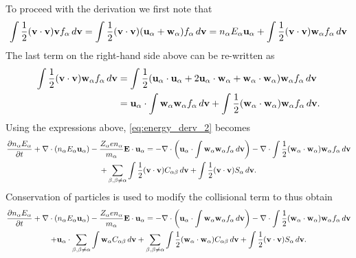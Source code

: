 \documentclass[a4paper,11pt]{report}
\begin{document}
To proceed with the derivation we first note that
\begin{multline}
\int \frac{1}{2} (\mathbf{v} \cdot \mathbf{v}) \mathbf{v} f_\alpha \, d\mathbf{v} = \int \frac{1}{2} (\mathbf{v} \cdot \mathbf{v}) (\mathbf{u}_\alpha + \mathbf{w}_\alpha) f_\alpha \, d\mathbf{v} = n_\alpha E_\alpha \mathbf{u}_\alpha + \int \frac{1}{2} (\mathbf{v} \cdot \mathbf{v} ) \mathbf{w}_\alpha f_\alpha \, d\mathbf{v}
\end{multline}
The last term on the right-hand side above can be re-written as
\begin{align}
\int \frac{1}{2} ( \mathbf{v} \cdot \mathbf{v} ) \mathbf{w}_\alpha f_\alpha \, d\mathbf{v} &= \int \frac{1}{2} ( \mathbf{u}_\alpha \cdot \mathbf{u}_\alpha + 2\mathbf{u}_\alpha \cdot \mathbf{w}_\alpha + \mathbf{w}_\alpha \cdot \mathbf{w}_\alpha ) \mathbf{w}_\alpha f_\alpha \, d\mathbf{v} \\
& =  \mathbf{u}_\alpha \cdot \int \mathbf{w}_\alpha \mathbf{w}_\alpha f_\alpha \, d\mathbf{v} + \int \frac{1}{2} ( \mathbf{w}_\alpha \cdot \mathbf{w}_\alpha ) \mathbf{w}_\alpha f_\alpha \, d\mathbf{v}.
\end{align}
Using the expressions above, \cref{eq:energy_derv_2} becomes
\begin{multline}
\label{eq:energy_derv_3}
\frac{\partial n_\alpha E_\alpha}{\partial t} + \nabla \cdot (n_\alpha E_\alpha \mathbf{u}_\alpha ) - \frac{Z_\alpha e n_\alpha}{m_\alpha} \mathbf{E} \cdot \mathbf{u}_\alpha =  - \nabla \cdot \left ( \mathbf{u}_\alpha \cdot \int \mathbf{w}_\alpha \mathbf{w}_\alpha f_\alpha \, d\mathbf{v} \right ) - \nabla \cdot \int \frac{1}{2} ( \mathbf{w}_\alpha \cdot \mathbf{w}_\alpha ) \mathbf{w}_\alpha f_\alpha \, d\mathbf{v}\\
+ \sum_{\beta, \beta \ne \alpha} \int \frac{1}{2} (\mathbf{v} \cdot \mathbf{v}) C_{\alpha \beta} \, d\mathbf{v} + \int \frac{1}{2} (\mathbf{v} \cdot \mathbf{v}) S_\alpha \, d\mathbf{v}.
\end{multline}
Conservation of particles is used to modify the collisional term to thus obtain
\begin{multline}
\label{eq:energy_derv_4}
\frac{\partial n_\alpha E_\alpha}{\partial t} + \nabla \cdot (n_\alpha E_\alpha \mathbf{u}_\alpha ) - \frac{Z_\alpha e n_\alpha}{m_\alpha} \mathbf{E} \cdot \mathbf{u}_\alpha = - \nabla \cdot \left ( \mathbf{u}_\alpha \cdot \int \mathbf{w}_\alpha \mathbf{w}_\alpha f_\alpha \, d\mathbf{v}  \right ) - \nabla \cdot \int \frac{1}{2} ( \mathbf{w}_\alpha \cdot \mathbf{w}_\alpha ) \mathbf{w}_\alpha f_\alpha \, d\mathbf{v} \\
+ \mathbf{u}_\alpha \cdot \sum_{\beta,\beta \ne \alpha} \int \mathbf{w}_\alpha C_{\alpha \beta} \, d\mathbf{v} + \sum_{\beta, \beta \ne \alpha} \int \frac{1}{2} (\mathbf{w}_\alpha \cdot \mathbf{w}_\alpha) C_{\alpha \beta} \, d\mathbf{v} + \int \frac{1}{2} (\mathbf{v} \cdot \mathbf{v}) S_\alpha \, d\mathbf{v}.
\end{multline}
\end{document}
